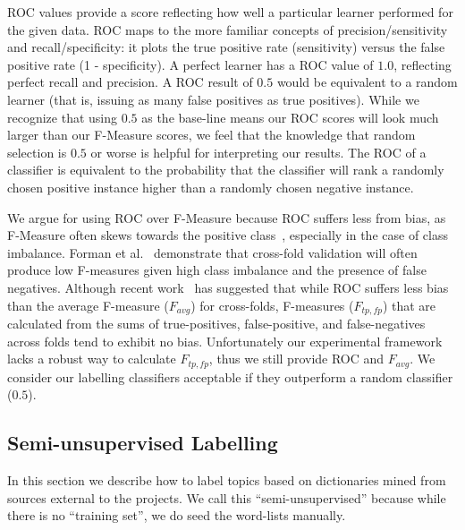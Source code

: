 \documentclass[smallextended]{svjour3}       %
\begin{document}
ROC values provide a score %
 reflecting how well a particular learner performed for the given data. 
ROC maps to the more familiar concepts of precision/sensitivity and recall/specificity: it plots the true positive rate (sensitivity) versus the false
positive rate (1 - specificity). 
A perfect learner has a ROC value of $1.0$, reflecting perfect recall and precision. 
A ROC result of $0.5$ would be equivalent to a random learner (that
is, issuing as many false positives as true positives). While we
recognize that using $0.5$ as the base-line means our ROC scores will
look much larger than our F-Measure scores, we feel that the knowledge
that random selection is $0.5$ or worse is helpful for interpreting our results.
The %
ROC of a classifier is equivalent to the probability that the classifier will rank a randomly chosen positive instance higher than a randomly chosen
negative instance.

We argue for using ROC over F-Measure because ROC suffers less from
bias, as F-Measure often skews towards the positive
class~\cite{flach-icml03,Forman:2010:ACS:1882471.1882479}, especially
in the case of class imbalance. Forman et
al.~\cite{Forman:2010:ACS:1882471.1882479} demonstrate that cross-fold
validation will often produce low F-measures given high class
imbalance and the presence of false negatives.
Although
recent work~\cite{Forman:2010:ACS:1882471.1882479} has suggested that while ROC suffers less bias than
the average F-measure ($F_{avg}$) for cross-folds, F-measures ($F_{tp,fp}$) that are calculated from
the sums of true-positives,
false-positive, and false-negatives across folds tend to exhibit no
bias. Unfortunately our experimental framework lacks a robust way to
calculate $F_{tp,fp}$, thus we still provide ROC and $F_{avg}$.
We consider our labelling classifiers acceptable if they outperform a random classifier ($0.5$). 


\subsection{Semi-unsupervised Labelling}
\label{sec:unsuplabelling}

In this section we describe how to label topics based on dictionaries
mined from sources external to the projects. We call this ``semi-unsupervised'' because while there is no ``training set'', we do seed the word-lists manually.
\end{document}
